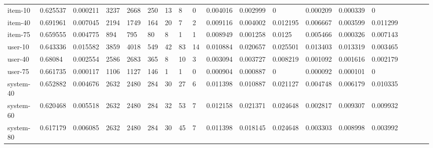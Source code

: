 \begin{table}
{\begin{tabular}{*{19}l}
item-10 &   0.625537 &  0.000211 &  3237 &  2668 &  250 &   13 &    8 & 0 & 0.004016 &  0.002999 &  0 & 0.000209 &  0.000339 &  0 &  \\
item-40 &   0.691961 &  0.007045 &  2194 &  1749 &  164 &   20 &    7 & 2 & 0.009116 &  0.004002 &  0.012195 &  0.006667 &  0.003599 &  0.011299 &   \\
item-75 &   0.659555 &  0.004775 &  894 &   795 &   80 &    8 & 1 & 1 & 0.008949 &  0.001258 &  0.0125 &    0.005466 &  0.000326 &  0.007143 &   \\
user-10 &   0.643336 &  0.015582 &  3859 &  4018 &  549 &   42 &    83 &    14 &    0.010884 &  0.020657 &  0.025501 &  0.013403 &  0.013319 &  0.003465 &   \\
user-40 &   0.68084 &   0.002554 &  2586 &  2683 &  365 &   8 & 10 &    3 & 0.003094 &  0.003727 &  0.008219 &  0.001092 &  0.001616 &  0.002179 &   \\
user-75 &   0.661735 &  0.000117 &  1106 &  1127 &  146 &   1 & 1 & 0 & 0.000904 &  0.000887 &  0 & 0.000092 &  0.000101 &  0 &  \\
system-40   &   0.652882 &  0.004676 &  2632 &  2480 &  284 &   30 &    27 &    6 & 0.011398 &  0.010887 &  0.021127 &  0.004748 &  0.006179 &  0.010335 &   \\
system-60   &   0.620468 &  0.005518 &  2632 &  2480 &  284 &   32 &    53 &    7 & 0.012158 &  0.021371 &  0.024648 &  0.002817 &  0.009307 &  0.009932 &   \\
system-80   &   0.617179 &  0.006085 &  2632 &  2480 &  284 &   30 &    45 &    7 & 0.011398 &  0.018145 &  0.024648 &  0.003303 &  0.008998 &  0.003992 &   \\


\end{tabular}}
\end{table}
